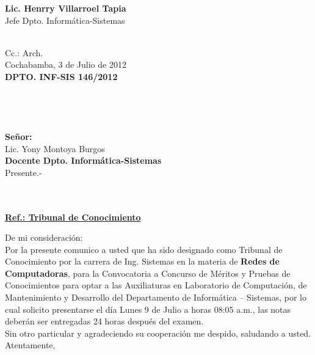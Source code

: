 \documentclass[letterpaper,11pt]{letter}
\begin{document}
\vspace{3.5cm}
\begin{center}
\begin{minipage}[b]{0.5\textwidth}
\begin{center}
{\bf Lic. Henrry Villarroel Tapia}\\
Jefe Dpto. Informática-Sistemas\\
\end{center}
\end{minipage}
\end{center}
~\\
Cc.: Arch.\\
\newpage
Cochabamba, 3 de Julio de 2012~\\
 \textbf{DPTO. INF-SIS 146/2012}\\
~\\
~\\
~\\
~\\
 \textbf{Señor:}~\\
Lic. Yony Montoya Burgos~\\
 \textbf{Docente Dpto. Informática-Sistemas}~\\
Presente.-\\
~\\
~\\
\begin{center}
\underline{ \textbf{Ref.: Tribunal de Conocimiento}}
\end{center}
De mi consideración:\\
Por la presente comunico a usted que ha sido designado como Tribunal de Conocimiento por la carrera de Ing. Sistemas en la materia de \textbf{Redes de Computadoras}, para la Convocatoria a Concurso de Méritos y Pruebas de Conocimientos para optar a las Auxiliaturas en Laboratorio de Computación, de Mantenimiento y Desarrollo del Departamento de Informática – Sistemas, por lo cual solicito presentarse el día Lunes 9 de Julio a horas 08:05 a.m., las notas deberán ser entregadas 24 horas después del examen.\\
Sin otro particular y agradeciendo su cooperación me despido, saludando a usted.\\
Atentamente,\\
\end{document}
